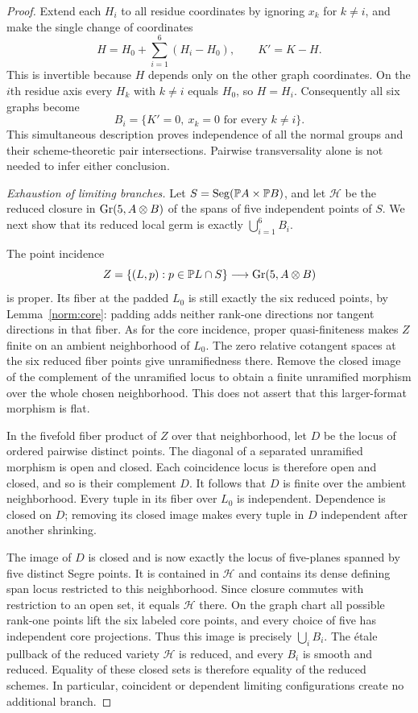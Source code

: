 \begin{proof}
Extend each $H_i$ to all residue coordinates by ignoring $x_k$ for
$k\neq i$, and make the single change of coordinates
\begin{equation}\label{nl:simultaneous-translation}
 H=H_0+\sum_{i=1}^6(H_i-H_0),\qquad K'=K-H.
\end{equation}
This is invertible because $H$ depends only on the other graph
coordinates. On the $i$th residue axis every $H_k$ with $k\neq i$
equals $H_0$, so $H=H_i$. Consequently all six graphs become
\begin{equation}\label{nl:straight-branches}
 B_i=\{K'=0,\ x_k=0\text{ for every }k\neq i\}.
\end{equation}
This simultaneous description proves independence of all the normal
groups and their scheme-theoretic pair intersections. Pairwise
transversality alone is not needed to infer either conclusion.

\medskip
\emph{Exhaustion of limiting branches.}
Let $S=\operatorname{Seg}(\mathbb P A\times\mathbb P B)$, and let $\mathcal H$ be the reduced
closure in $\operatorname{Gr}(5,A\otimes B)$ of the spans of five independent points
of $S$. We next show that its reduced local germ is exactly
$\bigcup_{i=1}^6B_i$.

The point incidence
\[
 Z=\{(L,p):p\in\mathbb P L\cap S\}
       \longrightarrow\operatorname{Gr}(5,A\otimes B)
\]
is proper. Its fiber at the padded $L_0$ is still exactly the six
reduced points, by Lemma~\ref{norm:core}: padding adds neither rank-one
directions nor tangent directions in that fiber. As for the core
incidence, proper quasi-finiteness makes $Z$ finite on an ambient
neighborhood of $L_0$. The zero relative cotangent spaces at the
six reduced fiber points give unramifiedness there. Remove the
closed image of the complement of the unramified locus to obtain
a finite unramified morphism over the whole chosen neighborhood.
This does not assert that this larger-format morphism is flat.

In the fivefold fiber product of $Z$ over that neighborhood, let $D$
be the locus of ordered pairwise distinct points. The diagonal of
a separated unramified morphism is open and closed. Each coincidence
locus is therefore open and closed, and so is their complement $D$.
It follows that $D$ is finite over the ambient neighborhood.
Every tuple in its fiber over $L_0$ is independent. Dependence is
closed on $D$; removing its closed image makes every tuple in $D$
independent after another shrinking.

The image of $D$ is closed and is now exactly the locus of five-planes
spanned by five distinct Segre points. It is contained in $\mathcal H$
and contains its dense defining span locus restricted to this
neighborhood. Since closure commutes with restriction to an open set,
it equals $\mathcal H$ there. On the graph chart all possible rank-one
points lift the six labeled core points, and every choice of five has
independent core projections. Thus this image is precisely
$\bigcup_i B_i$.
The \'etale pullback of the reduced variety $\mathcal H$ is reduced,
and every $B_i$ is smooth and reduced. Equality of these closed sets
is therefore equality of the reduced schemes. In particular, coincident
or dependent limiting configurations create no additional branch.


\end{proof}
